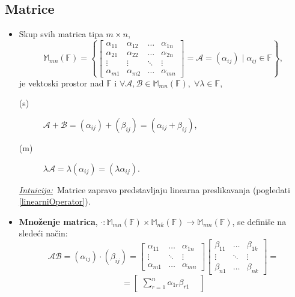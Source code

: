 \documentclass[a4paper,12pt,twoside]{report}
\numberwithin{algorithm}{section}
\newcommand{\intuicija}{\noindent\underline{\textit{Intuicija:}}\ }
\begin{document}
\subsection{Matrice}
\label{matrice}

\begin{itemize}
    \item Skup svih matrica tipa $m \times n$, 
    \[ \mathbb{M}_{mn}(\mathbb{F}) = \left\{\begin{bmatrix}
        \alpha_{11} & \alpha_{12} & \dots & \alpha_{1n} \\
        \alpha_{21} & \alpha_{22} & \dots & \alpha_{2n} \\
        \vdots & \vdots & \ddots & \vdots \\
        \alpha_{m1} & \alpha_{m2} & \dots & \alpha_{mn}
    \end{bmatrix} = \mathcal{A} = (\alpha_{ij}) \;\Bigg|\; \alpha_{ij} \in \mathbb{F}\right\}, \]
    je vektoski prostor nad $\mathbb{F}$ i $\forall \mathcal{A, B} \in \mathbb{M}_{mn}(\mathbb{F}), \; \forall \lambda \in \mathbb{F}$,
    \begin{description}
        \item[(s)] $\mathcal{A} + \mathcal{B} = (\alpha_{ij}) + (\beta_{ij}) = (\alpha_{ij} + \beta_{ij})$,
        \item[(m)] $\lambda \mathcal{A} = \lambda (\alpha_{ij}) = (\lambda \alpha_{ij})$. 
    \end{description}
    \intuicija Matrice zapravo predstavljaju linearna preslikavanja (pogledati \ref{linearniOperator}).
    \item \textbf{Množenje matrica}, $\cdot : \mathbb{M}_{mn}(\mathbb{F}) \times \mathbb{M}_{nk}(\mathbb{F}) \to \mathbb{M}_{mn}(\mathbb{F})$, se definiše na sledeći način:
    \[ \mathcal{AB} = (\alpha_{ij}) \cdot (\beta_{ij}) = \begin{bmatrix}
        \alpha_{11} & \dots & \alpha_{1n}\\
        \vdots & \ddots & \vdots \\
        \alpha_{m1} & \dots & \alpha_{mn}
    \end{bmatrix} \begin{bmatrix}
        \beta_{11} & \dots & \beta_{1k}\\
        \vdots & \ddots & \vdots \\
        \beta_{n1} & \dots & \beta_{nk}
    \end{bmatrix} = \]
    \[
        = 
        \begin{bmatrix}
        \displaystyle \sum_{r=1}^{n} \alpha_{1r}\beta_{r1} & 

\end{bmatrix}\]
\end{itemize}
\end{document}

